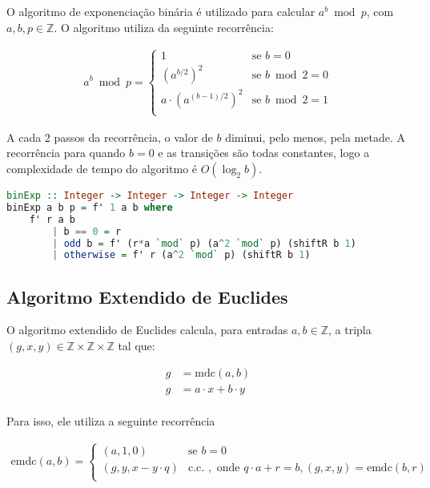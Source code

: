 \documentclass{article}
\begin{document}
O algoritmo de exponenciação binária é utilizado para calcular $a^b \bmod p$, com $a, b, p \in \mathbb{Z}$. O algoritmo utiliza da seguinte recorrência:

\begin{align*}
  a^b \bmod p = \begin{cases}
    1 & \text{se } b = 0 \\
    {(a^{b/2})}^2 & \text{se } b \bmod 2 = 0 \\
    a \cdot {(a^{(b-1)/2})}^2 & \text{se } b \bmod 2 = 1 \\
\end{cases}
\end{align*}

A cada 2 passos da recorrência, o valor de $b$ diminui, pelo menos, pela metade. A recorrência para quando $b = 0$ e as transições são todas constantes, logo a complexidade de tempo do algoritmo é $O(\log_2 b)$.

\begin{minipage}{.9\linewidth}
\begin{lstlisting}[language=haskell,caption=Exponenciação Binária]
binExp :: Integer -> Integer -> Integer -> Integer
binExp a b p = f' 1 a b where
    f' r a b
        | b == 0 = r
        | odd b = f' (r*a `mod` p) (a^2 `mod` p) (shiftR b 1)
        | otherwise = f' r (a^2 `mod` p) (shiftR b 1)

\end{lstlisting}
\end{minipage}

\subsection{Algoritmo Extendido de Euclides}

O algoritmo extendido de Euclides calcula, para entradas $a, b \in \mathbb{Z}$, a tripla $(g, x, y) \in \mathbb{Z} \times \mathbb{Z} \times \mathbb{Z}$ tal que:

\begin{align*}
  g & = \text{mdc}(a, b) \\
  g & = a \cdot x + b \cdot y \\
\end{align*}

Para isso, ele utiliza a seguinte recorrência

\begin{align*}
  \text{emdc}(a, b) = \begin{cases}
    (a, 1, 0) & \text{se } b = 0 \\
    (g, y, x - y \cdot q) & \text{c.c. }, \text{ onde } q \cdot a + r = b, (g, x, y) = \text{emdc}(b, r) \\
\end{cases}
\end{align*}
\end{document}
